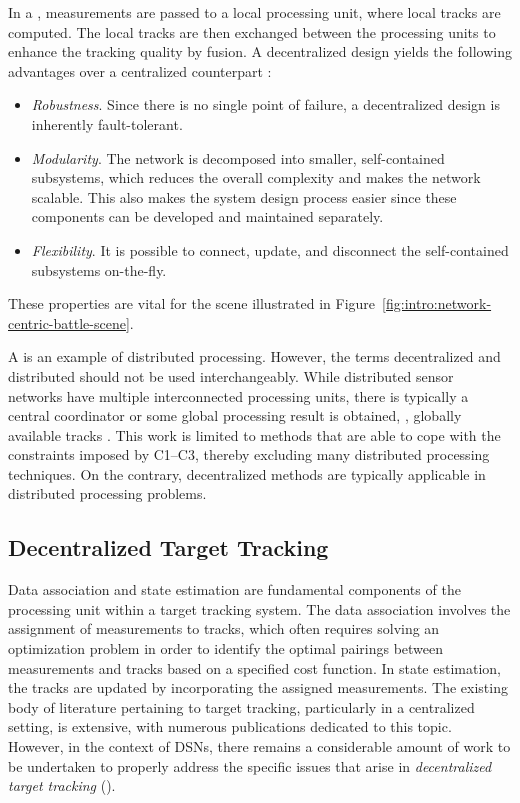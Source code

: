 In a \abbrDSN, measurements are passed to a local processing unit, where local tracks are computed. The local tracks are then exchanged between the processing units to enhance the tracking quality by fusion. A decentralized design yields the following advantages over a centralized counterpart \cite{Julier2009-ch14,Uhlmann2003IF}:
\begin{itemize}
	\item \emph{Robustness}. Since there is no single point of failure, a decentralized design is inherently fault-tolerant. 
	\item \emph{Modularity}. The network is decomposed into smaller, self-contained subsystems, which reduces the overall complexity and makes the network scalable. This also makes the system design process easier since these components can be developed and maintained separately.
	\item \emph{Flexibility}. It is possible to connect, update, and disconnect the self-contained subsystems on-the-fly.
\end{itemize}
These properties are vital for the scene illustrated in Figure~\ref{fig:intro:network-centric-battle-scene}.

\begin{remark}
A \abbrDSN is an example of distributed processing. However, the terms decentralized and distributed should not be used interchangeably. While distributed sensor networks have multiple interconnected processing units, there is typically a central coordinator or some global processing result is obtained, \eg, globally available tracks \cite{Castanedo2013TSWJ}. This work is limited to methods that are able to cope with the constraints imposed by C1--C3, thereby excluding many distributed processing techniques. On the contrary, decentralized methods are typically applicable in distributed processing problems.
\end{remark}




\subsection{Decentralized Target Tracking}

Data association and state estimation are fundamental components of the processing unit within a target tracking system. The data association involves the assignment of measurements to tracks, which often requires solving an optimization problem in order to identify the optimal pairings between measurements and tracks based on a specified cost function. In state estimation, the tracks are updated by incorporating the assigned measurements. The existing body of literature pertaining to target tracking, particularly in a centralized setting, is extensive, with numerous publications dedicated to this topic. However, in the context of DSNs, there remains a considerable amount of work to be undertaken to properly address the specific issues that arise in \emph{decentralized target tracking} (\abbrDTT).

